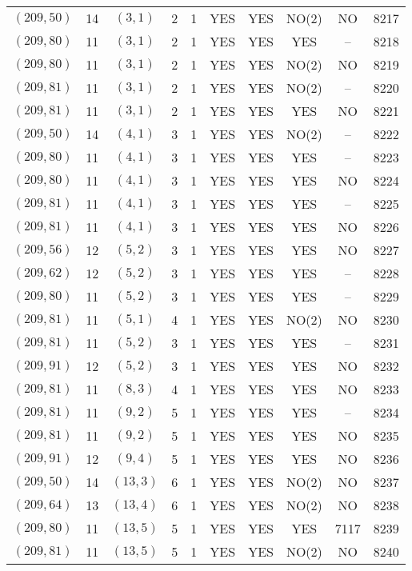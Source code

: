 \begin{longtable}{|c|c|c|c|c|c|c|c|c|c|}
$(209, 50)$ & 14 & $(3, 1)$ & 2 & 1 & YES & YES & NO(2) & NO & 8217\\
$(209, 80)$ & 11 & $(3, 1)$ & 2 & 1 & YES & YES & YES & -- & 8218\\
$(209, 80)$ & 11 & $(3, 1)$ & 2 & 1 & YES & YES & NO(2) & NO & 8219\\
$(209, 81)$ & 11 & $(3, 1)$ & 2 & 1 & YES & YES & NO(2) & -- & 8220\\
$(209, 81)$ & 11 & $(3, 1)$ & 2 & 1 & YES & YES & YES & NO & 8221\\
$(209, 50)$ & 14 & $(4, 1)$ & 3 & 1 & YES & YES & NO(2) & -- & 8222\\
$(209, 80)$ & 11 & $(4, 1)$ & 3 & 1 & YES & YES & YES & -- & 8223\\
$(209, 80)$ & 11 & $(4, 1)$ & 3 & 1 & YES & YES & YES & NO & 8224\\
$(209, 81)$ & 11 & $(4, 1)$ & 3 & 1 & YES & YES & YES & -- & 8225\\
$(209, 81)$ & 11 & $(4, 1)$ & 3 & 1 & YES & YES & YES & NO & 8226\\
$(209, 56)$ & 12 & $(5, 2)$ & 3 & 1 & YES & YES & YES & NO & 8227\\
$(209, 62)$ & 12 & $(5, 2)$ & 3 & 1 & YES & YES & YES & -- & 8228\\
$(209, 80)$ & 11 & $(5, 2)$ & 3 & 1 & YES & YES & YES & -- & 8229\\
$(209, 81)$ & 11 & $(5, 1)$ & 4 & 1 & YES & YES & NO(2) & NO & 8230\\
$(209, 81)$ & 11 & $(5, 2)$ & 3 & 1 & YES & YES & YES & -- & 8231\\
$(209, 91)$ & 12 & $(5, 2)$ & 3 & 1 & YES & YES & YES & NO & 8232\\
$(209, 81)$ & 11 & $(8, 3)$ & 4 & 1 & YES & YES & YES & NO & 8233\\
$(209, 81)$ & 11 & $(9, 2)$ & 5 & 1 & YES & YES & YES & -- & 8234\\
$(209, 81)$ & 11 & $(9, 2)$ & 5 & 1 & YES & YES & YES & NO & 8235\\
$(209, 91)$ & 12 & $(9, 4)$ & 5 & 1 & YES & YES & YES & NO & 8236\\
$(209, 50)$ & 14 & $(13, 3)$ & 6 & 1 & YES & YES & NO(2) & NO & 8237\\
$(209, 64)$ & 13 & $(13, 4)$ & 6 & 1 & YES & YES & NO(2) & NO & 8238\\
$(209, 80)$ & 11 & $(13, 5)$ & 5 & 1 & YES & YES & YES & 7117 & 8239\\
$(209, 81)$ & 11 & $(13, 5)$ & 5 & 1 & YES & YES & NO(2) & NO & 8240\\

\end{longtable}
